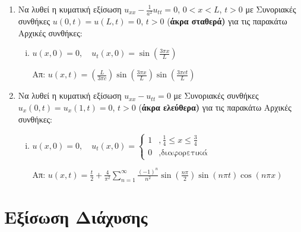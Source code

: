 \begin{enumerate}
\item Να λυθεί η κυματική εξίσωση $ u_{xx} - \frac{1}{ a^{2} } u_{tt} = 0 $, $ 0<x<L $, $ t>0
	$ με Συνοριακές συνθήκες $ u(0,t) = u(L,t) = 0 $, $ t>0 $ (\textbf{άκρα σταθερά)} για τις παρακάτω Αρχικές συνθήκες:

	\begin{enumerate}[(i)]
		\item $ u(x,0) = 0, \quad u_t(x,0) = \sin{\left(\frac{ 3\pi x }{ L }\right)} $ 

			\hfill Απ: $ u(x,t) = \left(\frac{ L }{ 3\pi c }\right) \sin{\left(\frac{ 3\pi x  }{ L
		}\right)} \sin{\left(\frac{3 \pi c t}{L}\right)} $
			
	\end{enumerate}




\item Να λυθεί η κυματική εξίσωση $ u_{xx} - u_{tt} = 0 $ με Συνοριακές συνθήκες
	$ u_x(0,t) = u_x(1,t) = 0 $, $ t>0 $ (\textbf{άκρα ελεύθερα)} για τις παρακάτω Αρχικές συνθήκες:

	\begin{enumerate}[(i)]
			\item $ u(x,0) = 0,\quad  u_t(x,0) = \begin{cases} 1 &, \frac{1}{ 4 } \leq x \leq \frac{
		3 }{ 4 }  \\ 0 &, \text{διαφορετικά}
		\end{cases}$	

		\hfill Απ: $ u(x,t) = \frac{ t }{ 2 } + \frac{ 4 }{ \pi^{2} } \sum_{n=1}^{\infty} \frac{
			(-1)^{n} }{ n^{2} } \sin{\left(\frac{ n\pi }{ 2 }\right)} \sin{(n\pi t)} \cos{(n\pi x)} $ 
	\end{enumerate}
\end{enumerate}


\section{Εξίσωση Διάχυσης}


